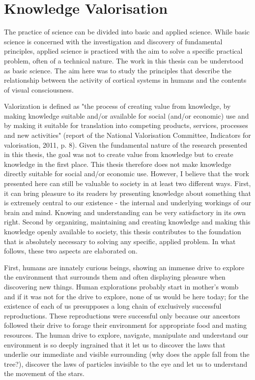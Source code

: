 \chapter{Knowledge Valorisation}
\beginvalorization
The practice of science can be divided into basic and applied science. While basic science is concerned with the investigation and discovery of fundamental principles, applied science is practiced with the aim to solve a specific practical problem, often of a technical nature. The work in this thesis can be understood as basic science. The aim here was to study the principles that describe the relationship between the activity of cortical systems in humans and the contents of visual consciousness.

Valorization is defined as "the process of creating value from knowledge, by making knowledge suitable and/or available for social (and/or economic) use and by making it suitable for translation into competing products, services, processes and new activities" (report of the National Valorisation Committee, Indicators for valorisation, 2011, p. 8). Given the fundamental nature of the research presented in this thesis, the goal was not to create value from knowledge but to create knowledge in the first place. This thesis therefore does not make knowledge directly suitable for social and/or economic use. However, I believe that the work presented here can still be valuable to society in at least two different ways. First, it can bring pleasure to its readers by presenting knowledge about something that is extremely central to our existence - the internal and underlying workings of our brain and mind. Knowing and understanding can be very satisfactory in its own right. Second by organizing, maintaining and creating knowledge and making this knowledge openly available to society, this thesis contributes to the foundation that is absolutely necessary to solving any specific, applied problem. In what follows, these two aspects are elaborated on.

First, humans are innately curious beings, showing an immense drive to explore the environment that surrounds them and often displaying pleasure when discovering new things. Human explorations probably start in mother's womb and if it was not for the drive to explore, none of us would be here today; for the existence of each of us presupposes a long chain of exclusively successful reproductions. These reproductions were successful only because our ancestors followed their drive to forage their environment for appropriate food and mating resources. The human drive to explore, navigate, manipulate and understand our environment is so deeply ingrained that it let us to discover the laws that underlie our immediate and visible surrounding (why does the apple fall from the tree?), discover the laws of particles invisible to the eye and let us to understand the movement of the stars.


